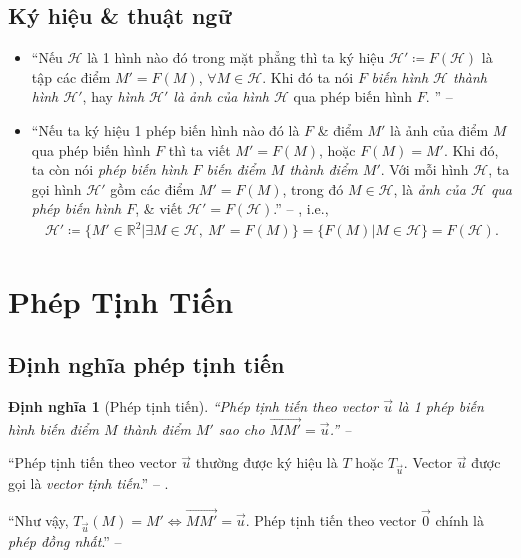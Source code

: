 \documentclass[oneside]{book}
\numberwithin{equation}{section}
\newtheorem{dinhnghia}{Định nghĩa}[section]
\begin{document}
\subsection{Ký hiệu \& thuật ngữ}
\begin{itemize}
	\item ``Nếu $\mathcal{H}$ là 1 hình nào đó trong mặt phẳng thì ta ký hiệu $\mathcal{H}'\coloneqq F(\mathcal{H})$ là tập các điểm $M' = F(M)$, $\forall M\in\mathcal{H}$. Khi đó ta nói $F$ \textit{biến hình $\mathcal{H}$ thành hình $\mathcal{H}'$}, hay \textit{hình $\mathcal{H}'$ là ảnh của hình $\mathcal{H}$} qua phép biến hình $F$.
	'' -- \cite[p. 4]{SGK_Toan_11_hinh_hoc_co_ban}
	\item ``Nếu ta ký hiệu 1 phép biến hình nào đó là $F$ \& điểm $M'$ là ảnh của điểm $M$ qua phép biến hình $F$ thì ta viết $M' = F(M)$, hoặc $F(M) = M'$. Khi đó, ta còn nói \textit{phép biến hình $F$ biến điểm $M$ thành điểm $M'$}. Với mỗi hình $\mathcal{H}$, ta gọi hình $\mathcal{H}'$ gồm các điểm $M' = F(M)$, trong đó $M\in\mathcal{H}$, là \textit{ảnh của $\mathcal{H}$ qua phép biến hình $F$}, \& viết $\mathcal{H}' = F(\mathcal{H})$.'' -- \cite[p. 5]{SGK_Toan_11_hinh_hoc_nang_cao}, i.e.,
	\begin{align*}
		\mathcal{H}'\coloneqq\{M'\in\mathbb{R}^2|\exists M\in\mathcal{H},\ M' = F(M)\} = \{F(M)|M\in\mathcal{H}\} = F(\mathcal{H}).
	\end{align*}
\end{itemize}

\section{Phép Tịnh Tiến}

\subsection{Định nghĩa phép tịnh tiến}

\begin{dinhnghia}[Phép tịnh tiến]
	``\emph{Phép tịnh tiến} theo vector $\vec{u}$ là 1 phép biến hình biến điểm $M$ thành điểm $M'$ sao cho $\overrightarrow{MM'} = \vec{u}$.'' -- \cite[p. 5]{SGK_Toan_11_hinh_hoc_nang_cao}
\end{dinhnghia}
``Phép tịnh tiến theo vector $\vec{u}$ thường được ký hiệu là $T$ hoặc $T_{\vec{u}}$. Vector $\vec{u}$ được gọi là \textit{vector tịnh tiến}.'' -- \cite[p. 5]{SGK_Toan_11_hinh_hoc_nang_cao}.

``Như vậy, $T_{\vec{u}}(M) = M'\Leftrightarrow\overrightarrow{MM'} = \vec{u}$. Phép tịnh tiến theo vector $\vec{0}$ chính là \textit{phép đồng nhất}.'' -- \cite[p. 5]{SGK_Toan_11_hinh_hoc_co_ban}
\end{document}

